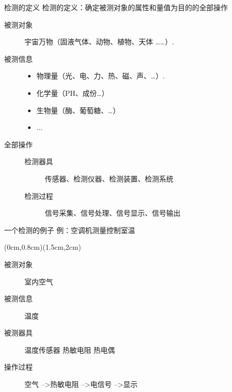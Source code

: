 \documentclass[10pt]{beamer}
\begin{document}
\begin{frame}{检测的定义}
检测的定义：确定被测对象的属性和量值为目的的全部操作
     \begin{description}
\item[\alert{被测对象}] 宇宙万物（固液气体、动物、植物、天体 ……）.
\item[\alert{被测信息}] \begin{itemize}
      \item 物理量（光、电、力、热、磁、声、…）.
      \item 化学量（PH、成份…）
      \item 生物量（酶、葡萄糖、…）
      \item ...
                \end{itemize}
\item[\alert{全部操作}] \begin{description}
            \item[检测器具] 传感器、检测仪器、检测装置、检测系统
            \item[检测过程] 信号采集、信号处理、信号显示、信号输出
                        \end{description}
\end{description}

\end{frame}
\begin{frame}{一个检测的例子}
例：空调机测量控制室温
 
(0cm,0.8cm)(1.5cm,2cm)
 \begin{description} 
    \item[被测对象] 室内空气
    \item[被测信息] 温度
    \item[被测器具] 温度传感器 热敏电阻 热电偶
    \item[操作过程] 空气 -->热敏电阻 -->电信号  -->显示

 \end{description}
 
 \end{frame}
\end{document}
